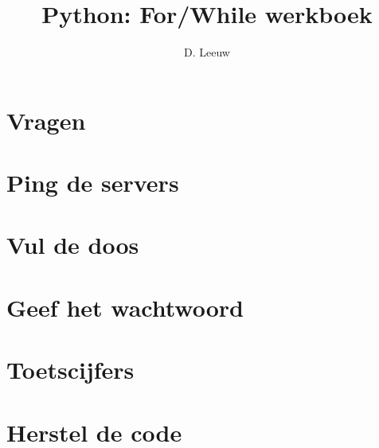 \documentclass[a4paper,12pt,twoside,openright,titlepage]{article}
\author{D. Leeuw}
\title{Python: For/While werkboek}
\date{\today\\
1.0.0\\
\vfill
\raggedright
\copyright\ 2025 Dennis Leeuw\\
}
\begin{document}

\maketitle



\section{Vragen}


\section{Ping de servers}


\section{Vul de doos}

\section{Geef het wachtwoord}

\section{Toetscijfers}


\section{Herstel de code}


\printindex
\end{document}
